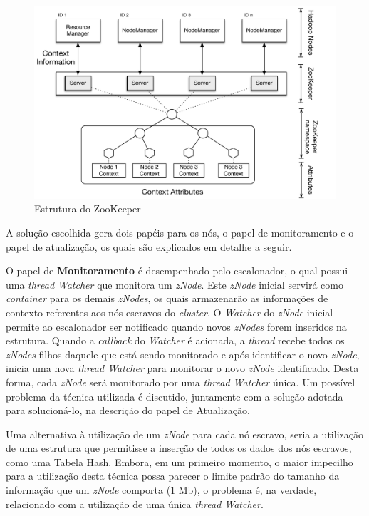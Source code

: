 \begin{figure}[!hbtn]
   \centering
   \includegraphics[width=15cm]{figuras/Zookeeper.pdf}
   \caption{Estrutura do ZooKeeper}
   \label{fig:zk}
\end{figure}

A solução escolhida gera dois papéis para os nós, o papel de monitoramento e o papel de atualização, os quais são explicados em detalhe a seguir.

O papel de \textbf{Monitoramento} é desempenhado pelo escalonador, o qual possui uma \textit{thread} \textit{Watcher} que monitora um \textit{zNode}. Este \textit{zNode} inicial servirá como \textit{container} para os demais \textit{zNodes}, os quais armazenarão as informações de contexto referentes aos nós escravos do \textit{cluster}. O \textit{Watcher} do \textit{zNode} inicial permite ao escalonador ser notificado quando novos \textit{zNodes} forem inseridos na estrutura. Quando a \textit{callback} do \textit{Watcher} é acionada, a \textit{thread} recebe todos os \textit{zNodes} filhos daquele que está sendo monitorado e após identificar o novo \textit{zNode}, inicia uma nova \textit{thread Watcher} para monitorar o novo \textit{zNode} identificado. Desta forma, cada \textit{zNode} será monitorado por uma \textit{thread Watcher} única. Um possível problema da técnica utilizada é discutido, juntamente com a solução adotada para solucioná-lo, na descrição do papel de Atualização.

Uma alternativa à utilização de um \textit{zNode} para cada nó escravo, seria a utilização de uma estrutura que permitisse a inserção de todos os dados dos nós escravos, como uma Tabela Hash. Embora, em um primeiro momento, o maior impecilho para a utilização desta técnica possa parecer o limite padrão do tamanho da informação que um \textit{zNode} comporta (1 Mb), o problema é, na verdade, relacionado com a utilização de uma única \textit{thread Watcher}. 

